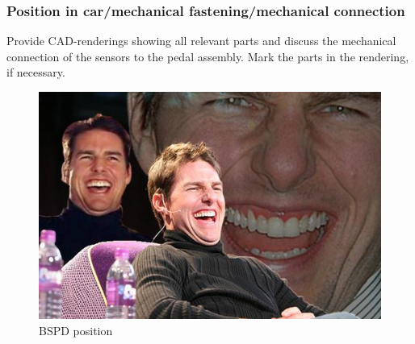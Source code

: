 \subsubsection{Position in car/mechanical fastening/mechanical connection}
Provide CAD-renderings showing all relevant parts and discuss the mechanical connection of the sensors to the pedal assembly. Mark the parts in the rendering, if necessary.

\begin{figure}[H]
	\centering
	\includegraphics[width=.5\textwidth]{./img/bspd-position.jpg}
	\caption{BSPD position}
	\label{fig:BSPD-position}
\end{figure}

